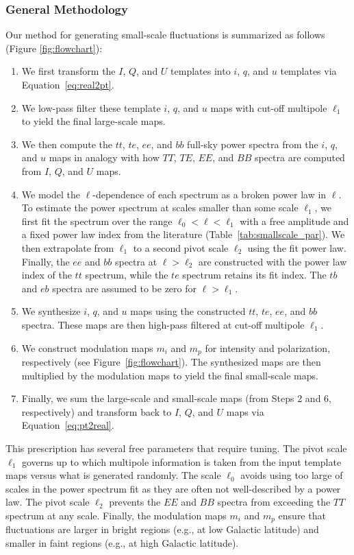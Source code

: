 \documentclass[twocolumn]{aastex631}
\begin{document}
\subsubsection{General Methodology}\label{subsec:methodology}
Our method for generating small-scale fluctuations is summarized as follows (Figure \ref{fig:flowchart}): 
\begin{enumerate}
    \item We first transform the $I$, $Q$, and $U$ templates into $i$, $q$, and $u$ templates via Equation~\eqref{eq:real2pt}.
    \item We low-pass filter these template $i$, $q$, and $u$ maps with cut-off multipole $\ell_1$ to yield the final large-scale maps.
    \item We then compute the $tt$, $te$, $ee$, and $bb$ full-sky power spectra from the $i$, $q$, and $u$ maps in analogy with how $TT$, $TE$, $EE$, and $BB$ spectra are computed from $I$, $Q$, and $U$ maps.
    \item We model the $\ell$-dependence of each spectrum as a broken power law in $\ell$. To estimate the power spectrum at scales smaller than some scale $\ell_1$, we first fit the spectrum over the range $\ell_0 < \ell < \ell_1$ with a free amplitude and a fixed power law index from the literature (Table~\ref{tab:smallscale_par}). We then extrapolate from $\ell_1$ to a second pivot scale $\ell_2$ using the fit power law. Finally, the $ee$ and $bb$ spectra at $\ell > \ell_2$ are constructed with the power law index of the $tt$ spectrum, while the $te$ spectrum retains its fit index. The $tb$ and $eb$ spectra are assumed to be zero for $\ell > \ell_1$.
    \item  We synthesize $i$, $q$, and $u$ maps using the constructed $tt$, $te$, $ee$, and $bb$ spectra. These maps are then high-pass filtered at cut-off multipole $\ell_1$.
    \item We construct modulation maps $m_i$ and $m_p$ for intensity and polarization, respectively (see Figure~\ref{fig:flowchart}). The synthesized maps are then multiplied by the modulation maps to yield the final small-scale maps.
    \item Finally, we sum the large-scale and small-scale maps (from Steps 2 and 6, respectively) and transform back to $I$, $Q$, and $U$ maps via Equation~\eqref{eq:pt2real}.
\end{enumerate}

This prescription has several free parameters that require tuning. The pivot scale $\ell_1$ governs up to which multipole information is taken from the input template maps versus what is generated randomly. The scale $\ell_0$ avoids using too large of scales in the power spectrum fit as they are often not well-described by a power law. The pivot scale $\ell_2$ prevents the $EE$ and $BB$ spectra from exceeding the $TT$ spectrum at any scale. Finally, the modulation maps $m_i$ and $m_p$ ensure that fluctuations are larger in bright regions (e.g., at low Galactic latitude) and smaller in faint regions (e.g., at high Galactic latitude).
\end{document}
